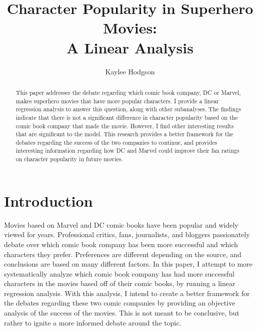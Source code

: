 \documentclass{svproc}
\begin{document}
\mainmatter              %
%
\title{Character Popularity in Superhero Movies: \\ A Linear Analysis}
%
%
\author{Kaylee Hodgson}
%
%

\maketitle              %

\begin{abstract}
This paper addresses the debate regarding which comic book company, DC or Marvel, makes superhero movies that have more popular characters. I provide a linear regression analysis to answer this question, along with other subanalyses. The findings indicate that there is not a significant difference in character popularity based on the comic book company that made the movie. However, I find other interesting results that are significant to the model. This research provides a better framework for the debates regarding the success of the two companies to continue, and provides interesting information regarding how DC and Marvel could improve their fan ratings on character popularity in future movies.
\end{abstract}

\section{Introduction}

Movies based on Marvel and DC comic books have been popular and widely viewed for years. Professional critics, fans, journalists, and bloggers passionately debate over which comic book company has been more successful and which characters they prefer. Preferences are different depending on the source, and conclusions are based on many different factors. In this paper, I attempt to more systematically analyze which comic book company has had more successful characters in the movies based off of their comic books, by running a linear regression analysis. With this analysis, I intend to create a better framework for the debates regarding these two comic companies by providing an objective analysis of the success of the movies. This is not meant to be conclusive, but rather to ignite a more informed debate around the topic. 
\end{document}
